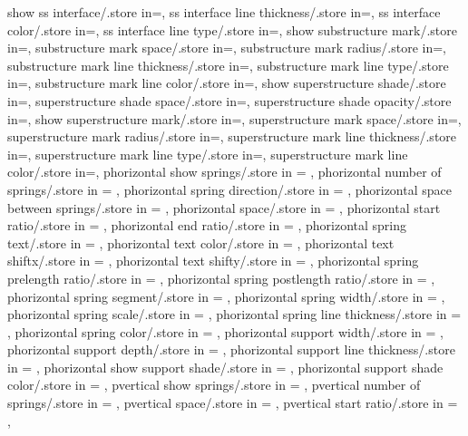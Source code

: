 {  show ss interface/.store in=\showssinter,
  ss interface line thickness/.store in=\ssinterlinet,
  ss interface color/.store in=\ssintercolor,
  ss interface line type/.store in=\ssinterlinetype,
  show substructure mark/.store in=\showmarkss,
  substructure mark space/.store in=\markssexspace,
  substructure mark radius/.store in=\markssrad,
  substructure mark line thickness/.store in=\marksslinet,
  substructure mark line type/.store in=\marksslinetype,
  substructure mark line color/.store in=\marksslinecolor,
  show superstructure shade/.store in=\showsupershade,
  superstructure shade space/.store in=\supershadespace,
  superstructure shade opacity/.store in=\supershadeopacity,
  show superstructure mark/.store in=\showmarksuper,
  superstructure mark space/.store in=\marksuperexspace,
  superstructure mark radius/.store in=\marksuperrad,
  superstructure mark line thickness/.store in=\marksuperlinet,
  superstructure mark line type/.store in=\marksuperlinetype,
  superstructure mark line color/.store in=\marksuperlinecolor,
  phorizontal show springs/.store in = \showphorizontalsprings,
  phorizontal number of springs/.store in = \phorspringnumber,
  phorizontal spring direction/.store in = \phorspringdir,
  phorizontal space between springs/.store in = \phorspbtwspr,
  phorizontal space/.store in = \phorspringspace,
  phorizontal start ratio/.store in = \phorspringstartratio,
  phorizontal end ratio/.store in = \phorspringendratio,
  phorizontal spring text/.store in = \phorspringtext,
  phorizontal text color/.store in = \phortextcolor,
  phorizontal text shiftx/.store in = \phortextshiftx,
  phorizontal text shifty/.store in = \phortextshifty,
  phorizontal spring prelength ratio/.store in = \phorprelenratio,
  phorizontal spring postlength ratio/.store in = \phorpostlenratio,
  phorizontal spring segment/.store in = \phorsegm,
  phorizontal spring width/.store in = \phorsprwid,
  phorizontal spring scale/.store in = \phorsprscale,
  phorizontal spring line thickness/.store in = \phorsprlinethk,
  phorizontal spring color/.store in = \phorsprcolor,
  phorizontal support width/.store in = \phorsuppwidth,
  phorizontal support depth/.store in = \phorsuppdepth,
  phorizontal support line thickness/.store in = \phorsupplinethk,
  phorizontal show support shade/.store in = \phorshowsuppshade,
  phorizontal support shade color/.store in = \phorsuppshadecol,
  pvertical show springs/.store in = \showpverticalsprings,
  pvertical number of springs/.store in = \pverspringnumber,
  pvertical space/.store in = \pverspringspace,
  pvertical start ratio/.store in = \pverspringstartratio,
}
